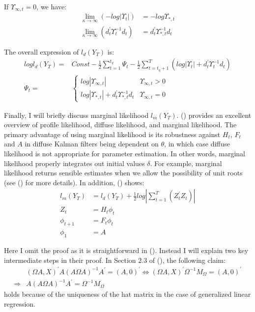 \documentclass[10pt]{article}
\numberwithin{equation}{section}
\begin{document}
If $\Upsilon_{\infty,t}=0$, we have:
\begin{align*}
    \lim_{\kappa\rightarrow \infty}(-log|\Upsilon_t|) &= -log{\Upsilon_{*,t}} \\
    \lim_{\kappa\rightarrow \infty}(d_t^{'}\Upsilon_t^{-1}d_t) &= d_t^{'}\Upsilon_{*,t}^{-1}d_t
\end{align*}

The overall expression of $l_d(Y_T)$ is:
\begin{align*}
    logl_d(Y_T) =& Const - \frac{1}{2}\sum_{t=1}^{t_q}\Psi_t - \frac{1}{2}\sum_{t=t_q+1}^{T}(log|\Upsilon_t| + d_t^{'}\Upsilon_t^{-1}d_t) \nonumber \\
    \Psi_t =& \begin{cases}
        log|\Upsilon_{\infty,t}| & \Upsilon_{\infty,t} > 0 \\
        log|\Upsilon_{*,t}| + d_t^{'}\Upsilon_{*,t}^{-1}d_t & \Upsilon_{\infty,t}=0
    \end{cases} \nonumber
\end{align*}

Finally, I will briefly discuss marginal likelihood $l_m(Y_T)$. (\cite{francke2010likelihood}) provides an excellent overview of profile likelihood, diffuse likelihood, and marginal likelihood. The primary advantage of using marginal likelihood is its robustness against $H_t$, $F_t$ and $A$ in diffuse Kalman filters being dependent on $\theta$, in which case diffuse likelihood is not appropriate for parameter estimation. In other words, marginal likelihood properly integrates out initial values $\delta$. For example, marginal likelihood returns sensible estimates when we allow the possibility of unit roots (see (\cite{francke2007marginal}) for more details). In addition, (\cite{francke2010likelihood}) shows:
\begin{align*}
    l_m(Y_T) &= l_d(Y_T) + \frac{1}{2}log\left| \sum_{t=1}^{T}(Z_t^{'}Z_t) \right| \\
    Z_t &= H_t\phi_t \\
    \phi_{t+1} &= F_t\phi_t \\
    \phi_1 &= A
\end{align*}

Here I omit the proof as it is straightforward in (\cite{francke2010likelihood}). Instead I will explain two key intermediate steps in their proof. In Section 2.3 of (\cite{francke2010likelihood}), the following claim:
\begin{align*}
    &(\Omega A,X)^{'}A(A\Omega A)^{-1}A^{'}=(A,0)^{'} \Leftrightarrow (\Omega A,X)^{'}\Omega^{-1}M_{\Omega} = (A,0)^{'} \\
    \Rightarrow&A(A\Omega A)^{-1}A^{'}=\Omega^{-1}M_{\Omega}
\end{align*}
holds because of the uniqueness of the hat matrix in the case of generalized linear regression. 
\end{document}
